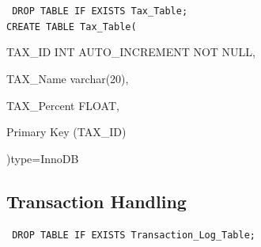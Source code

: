 \documentclass{report}
\begin{document}
\begin{itemize}
        {\tt\small
        DROP TABLE IF EXISTS Tax\_Table;\\

        CREATE TABLE Tax\_Table(
        \begin{list}{}
            \item{TAX\_ID          INT AUTO\_INCREMENT NOT NULL,}
            \item{TAX\_Name        varchar(20),}
            \item{TAX\_Percent     FLOAT,}
            \item{Primary Key (TAX\_ID)}
        \end{list}
        )type=InnoDB\\
        }

        \subsection{Transaction Handling}
        {\tt\small
        DROP TABLE IF EXISTS Transaction\_Log\_Table;\\

}
\end{itemize}
\end{document}
